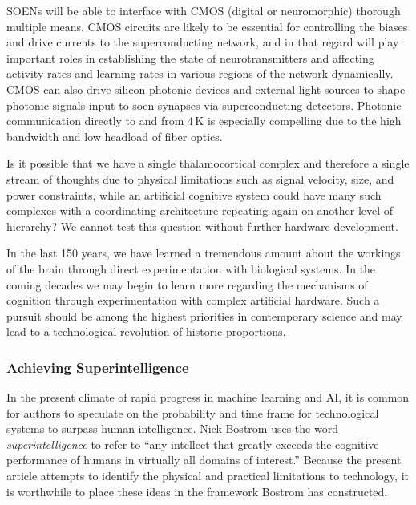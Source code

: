 SOENs will be able to interface with CMOS (digital or neuromorphic) thorough multiple means. CMOS circuits are likely to be essential for controlling the biases and drive currents to the superconducting network, and in that regard will play important roles in establishing the state of neurotransmitters and affecting activity rates and learning rates in various regions of the network dynamically. CMOS can also drive silicon photonic devices and external light sources to shape photonic signals input to soen synapses via superconducting detectors. Photonic communication directly to and from 4\,K is especially compelling due to the high bandwidth and low headload of fiber optics. 

\vspace{3em}
Is it possible that we have a single thalamocortical complex and therefore a single stream of thoughts due to physical limitations such as signal velocity, size, and power constraints, while an artificial cognitive system could have many such complexes with a coordinating architecture repeating again on another level of hierarchy? We cannot test this question without further hardware development.

\vspace{3em}
In the last 150 years, we have learned a tremendous amount about the workings of the brain through direct experimentation with biological systems. In the coming decades we may begin to learn more regarding the mechanisms of cognition through experimentation with complex artificial hardware. Such a pursuit should be among the highest priorities in contemporary science and may lead to a technological revolution of historic proportions.

\subsubsection{Achieving Superintelligence}
In the present climate of rapid progress in machine learning and AI, it is common for authors to speculate on the probability and time frame for technological systems to surpass human intelligence. Nick Bostrom uses the word \textit{superintelligence} to refer to ``any intellect that greatly exceeds the cognitive performance of humans in virtually all domains of interest.'' \cite{bo2014} Because the present article attempts to identify the physical and practical limitations to technology, it is worthwhile to place these ideas in the framework Bostrom has constructed.  

